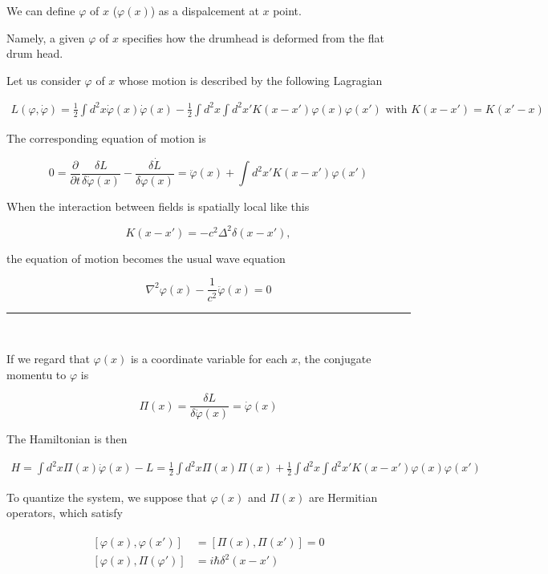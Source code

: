 We can define $\varphi$ of $x$ ($\varphi(x)$) as a dispalcement at $x$ point. 

Namely, a given $\varphi$ of $x$ specifies how the drumhead is deformed from the flat drum head. 

Let us consider $\varphi$ of $x$ whose motion is described by the following Lagragian

\begin{align}
L(\varphi,\dot{\varphi}) = \frac{1}{2}\int d^2 x\dot{\varphi}(x)\dot{\varphi}(x) - \frac{1}{2}\int d^2 x \int d^2 x' K(x-x')\varphi(x)\varphi(x')\text{ with }K(x-x') = K(x'-x)
\end{align}

The corresponding equation of motion is

\begin{equation}
0 = \frac{\partial}{\partial t}\frac{\delta L}{\delta \dot{\varphi}(x)} - \frac{\delta\dot{L}}{\delta \varphi(x)} = \ddot{\varphi}(x)+\int d^2 x' K(x-x')\varphi(x')
\end{equation}

When the interaction between fields is spatially local like this

\[K(x-x') = -c^2\Delta^2\delta(x-x'), \]

the equation of motion becomes the usual wave equation

\[\nabla^2\varphi(x) - \frac{1}{c^2}\ddot{\varphi}(x) = 0 \]

\hrule

\ 

If we regard that $\varphi(x)$ is a coordinate variable for each $x$, the conjugate momentu to $\varphi$ is

\[\Pi(x) = \frac{\delta L}{\delta \dot{\varphi}(x)} = \dot{\varphi}(x) \]

The Hamiltonian is then 

\begin{align}
H = \int d^2 x \Pi(x) \dot{\varphi}(x) - L = \frac{1}{2}\int d^2 x \Pi(x)\Pi(x)+\frac{1}{2}\int d^2 x \int d^2 x' K(x-x') \varphi(x)\varphi(x')
\end{align}

To quantize the system, we suppose that $\varphi(x)$ and $\Pi(x)$ are Hermitian operators, which satisfy

\begin{align}
\begin{split}
[\varphi(x),\varphi(x')] &= [\Pi(x),\Pi(x')] = 0\\
[\varphi(x),\Pi(\varphi')] &= i\hbar\delta^2(x-x')
\end{split}
\end{align}

